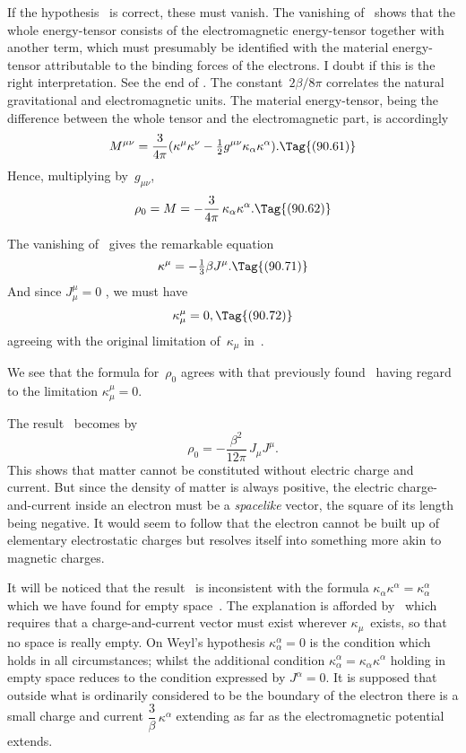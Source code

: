 \documentclass[12pt]{book}
\begin{document}
If the hypothesis~ is correct, these must vanish. The vanishing of~
shows that the whole energy\hyp{}tensor consists of the electromagnetic
energy\hyp{}tensor together with another term, which must presumably be identified
with the material energy\hyp{}tensor attributable to the binding forces of the
electrons\footnotemark.\footnotetext
  {I doubt if this is the right interpretation. See the end of .}
The constant~$2\beta/8\pi$ correlates the natural gravitational and
electromagnetic units. The material energy\hyp{}tensor, being the difference between
the whole tensor and the electromagnetic part, is accordingly
\[
M^{\mu\nu} = \frac{3}{4\pi} (\kappa^{\mu} \kappa^{\nu} - \tfrac{1}{2} g^{\mu\nu} \kappa_{\alpha} \kappa^{\alpha}).
\Tag{(90.61)}
\]
Hence, multiplying by~$g_{\mu\nu}$,
\[
\rho_{0} = M = -\frac{3}{4\pi}\, \kappa_{\alpha} \kappa^{\alpha}.
\Tag{(90.62)}
\]

The vanishing of~ gives the remarkable equation
\[
\kappa^{\mu} = -\tfrac{1}{3}\beta J^{\mu}.
\Tag{(90.71)}
\]
And since $J_{\mu}^{\mu} = 0$ , we must have
\[
\kappa_{\mu}^{\mu} = 0,
\Tag{(90.72)}
\]
agreeing with the original limitation of~$\kappa_{\mu}$ in~.

We see that the formula for~$\rho_{0}$  agrees with that previously found~
having regard to the limitation $\kappa_{\mu}^{\mu} = 0$.

The result~ becomes by~
\[
\rho_{0} = -\frac{\beta^2}{12\pi}\, J_{\mu} J^{\mu}.
\]
This shows that matter cannot be constituted without electric charge and
current. But since the density of matter is always positive, the electric charge\hyp{}and\hyp{}current
inside an electron must be a \emph{spacelike} vector, the square of its
%
%
length being negative. It would seem to follow that the electron cannot be
built up of elementary electrostatic charges but resolves itself into something
more akin to magnetic charges.

It will be noticed that the result~ is inconsistent with the formula
$\kappa_{\alpha} \kappa^{\alpha} = \kappa_{\alpha}^{\alpha}$ which we have found for empty space~. The explanation is afforded
by~ which requires that a charge\hyp{}and\hyp{}current vector must exist wherever
$\kappa_{\mu}$~exists, so that no space is really empty. On Weyl's hypothesis $\kappa_{\alpha}^{\alpha} = 0$ is the
condition which holds in all circumstances; whilst the additional condition
$\kappa_{\alpha}^{\alpha} = \kappa_{\alpha} \kappa^{\alpha}$ holding in empty space reduces to the condition expressed by $J^{\alpha} = 0$.
It is supposed that outside what is ordinarily considered to be the boundary
of the electron there is a small charge and current $\dfrac{3}{\beta}\, \kappa^{\alpha}$ extending as far as the
electromagnetic potential extends.
\end{document}

